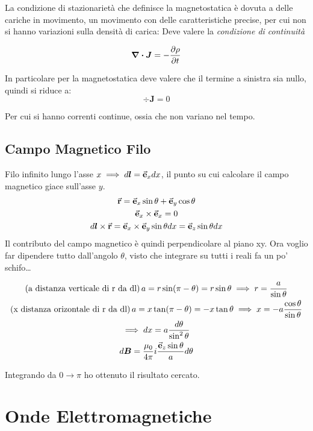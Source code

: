 \documentclass[a4paper]{scrarticle}
\begin{document}
La condizione di stazionarietà che definisce la magnetostatica è dovuta a delle cariche in movimento, un movimento con delle caratteristiche precise, per cui non si hanno variazioni sulla densità di carica: Deve valere la \emph{condizione di continuità}

\begin{equation}
    \div \bm J = - \pdv{\rho}{t}
\end{equation}

In particolare per la magnetostatica deve valere che il termine a sinistra sia nullo, quindi si riduce a:
\begin{equation}
    \div \bm J = 0
\end{equation}

Per cui si hanno correnti continue, ossia che non variano nel tempo.

\subsection{Campo Magnetico Filo}

Filo infinito lungo l'asse $x\implies d \bm l = \va e_x dx$, il punto su cui calcolare il campo magnetico giace sull'asse $y$.
\begin{gather*}
    \va r = \va e_x \sin \theta + \va e_y \cos \theta\\
    \va e_x \times \va e_x = 0\\
    d \bm l \times \va r = \va e_x \times \va e_y \sin \theta dx = \va e_z \sin \theta dx
\end{gather*}
Il contributo del campo magnetico è quindi perpendicolare al piano xy. Ora voglio far dipendere tutto dall'angolo $\theta$, visto che integrare su tutti i reali fa un po' schifo\dots

\begin{gather*}
    (\text{a distanza verticale di r da dl})\, a = r \sin(\pi - \theta) = r \sin \theta \implies r = \frac{a}{\sin \theta}\\
    (\text{x distanza orizontale di r da dl})\, a= x \tan (\pi -\theta) = -x \tan \theta \implies x = -a \frac{\cos \theta}{\sin \theta}\\
    \implies dx = a \frac{d \theta}{\sin^2 \theta}\\
    d \bm B = \frac{\mu_0}{4\pi}i \frac{\va e_z \sin \theta}{a}d\theta
\end{gather*}

Integrando da $0 \to \pi$ ho ottenuto il risultato cercato.

\section{Onde Elettromagnetiche}
\end{document}
